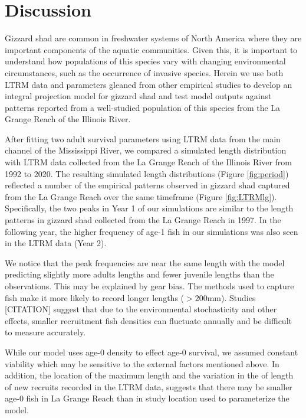 \documentclass[preprint,review,12pt,authoryear]{elsarticle}
\begin{document}
\section{Discussion}


Gizzard shad are common in freshwater systems of North America where they are important components of the aquatic communities. 
Given this, it is important to understand how populations of this species vary with changing environmental circumstances, such as the occurrence of invasive species. 
Herein we use both LTRM data and parameters gleaned from other empirical studies to develop an integral projection model for gizzard shad and test model outputs against patterns reported from a well-studied population of this species from the La Grange Reach of the Illinois River.   

After fitting two adult survival parameters using LTRM data from the main channel of the Mississippi River, we compared a simulated length distribution with LTRM data collected from the La Grange Reach of the Illinois River from 1992 to 2020. 
The resulting simulated length distributions (Figure \ref{fig:period}) reflected a number of the empirical patterns observed in gizzard shad captured from the La Grange Reach over the same timeframe (Figure \ref{fig:LTRMlg}). 
Specifically, the two peaks in Year 1 of our simulations are similar to the length patterns in gizzard shad collected from the La Grange Reach in 1997.  
In the following year, the higher frequency of age-1 fish in our simulations was also seen in the LTRM data (Year 2).

We notice that the peak frequencies are near the same length with the model predicting slightly more adults lengths and fewer juvenile lengths than the observations. 
This may be explained by gear bias.
The methods used to capture fish make it more likely to record longer lengths ($>200$mm). 
Studies [CITATION] suggest that due to the environmental stochasticity and other effects, smaller recruitment fish densities can fluctuate annually and be difficult to measure accurately. 

While our model uses age-0 density to effect age-0 survival, we assumed constant viability which may be sensitive to the external factors mentioned above.
In addition, the location of the maximum length and the variation in the of length of new recruits recorded in the LTRM data, suggests that there may be smaller age-0 fish in La Grange Reach than in study location \citep{michaletz2017variation} used to parameterize the model.  
\end{document}
